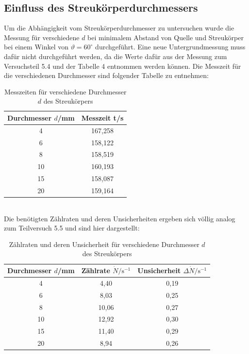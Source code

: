 \documentclass[german,  %
parskip=full,  %
]{scrartcl}
\begin{document}
\subsection{Einfluss des Streukörperdurchmessers}
Um die Abhängigkeit vom Streukörperdurchmesser zu untersuchen wurde die Messung für verschiedene $d$ bei minimalem Abstand von Quelle und Streukörper bei einem Winkel von $\vartheta = 60^{\circ}$ durchgeführt. Eine neue Untergrundmessung muss dafür nicht durchgeführt werden, da die Werte dafür aus der Messung zum Versuchsteil 5.4 und der Tabelle 4 entnommen werden können. Die Messzeit für die verschiedenen Durchmesser sind folgender Tabelle zu entnehmen:
\\
\begin{table}[h!]\centering
\begin{tabular}{|c|c|}\hline
Durchmesser $d$/mm & Messzeit t/s \\\hline
4  &  167,258		\\\hline
6  & 158,122	\\\hline
8   &  158,519	\\\hline
10   &  160,193	\\\hline
15   & 158,087	\\\hline
20 & 159,164	\\\hline
\end{tabular}
\caption{Messzeiten für verschiedene Durchmesser $d$ des Streukörpers}
\end{table}
\\
Die benötigten Zählraten und deren Unsicherheiten ergeben sich völlig analog zum Teilversuch 5.5 und sind hier dargestellt:
\\
\begin{table}[h!]\centering
\begin{tabular}{|c|c|c|}\hline
Durchmesser $d$/mm & Zählrate $\dot{N}/\text{s}^{-1}$ & Unsicherheit $\Delta \dot{N}/\text{s}^{-1}$  \\\hline
4  &  4,40 & 0,19		\\\hline
6  & 8,03 & 0,25	\\\hline
8   &  10,06 & 0,27	\\\hline
10   &  12,92 & 0,30	\\\hline
15   & 11,40 & 0,29	\\\hline
20 & 8,94 & 0,26	\\\hline
\end{tabular}
\caption{Zählraten und deren Unsicherheit für verschiedene Durchmesser $d$ des Streukörpers}
\end{table}
\\
\end{document}
